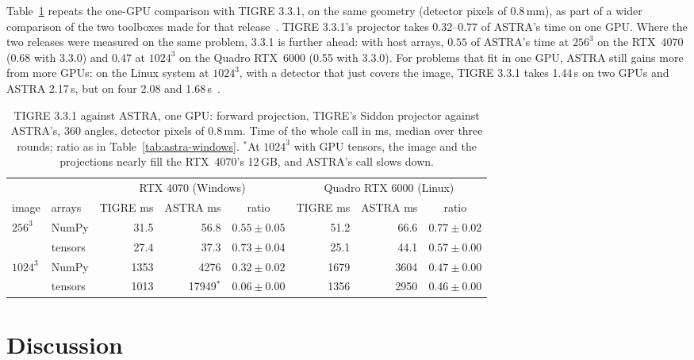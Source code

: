 \documentclass[11pt,a4paper]{article}
\theoremstyle{remark}
\begin{document}
Table~\ref{tab:astra-331} repeats the one-GPU comparison with TIGRE 3.3.1, on the same geometry (detector pixels of
0.8\,mm), as part of a wider comparison of the two toolboxes made for that release~\cite{tigre331astra}. TIGRE
3.3.1's projector takes 0.32--0.77 of ASTRA's time on one GPU. Where the two releases were measured on the same
problem, 3.3.1 is further ahead: with host arrays, $0.55$ of ASTRA's time at $256^3$ on the RTX~4070 (0.68 with
3.3.0) and 0.47 at $1024^3$ on the Quadro RTX~6000 (0.55 with 3.3.0). For problems that fit in one GPU, ASTRA still gains more from more GPUs: on
the Linux system at $1024^3$, with a detector that just covers the image, TIGRE 3.3.1 takes 1.44\,s on two GPUs and
ASTRA 2.17\,s, but on four 2.08 and 1.68\,s~\cite{tigre331astra}.

\begin{table}[h]
\centering
\caption{\label{tab:astra-331}TIGRE 3.3.1 against ASTRA, one GPU: forward projection, TIGRE's Siddon projector
against ASTRA's, 360 angles, detector pixels of 0.8\,mm. Time of the whole call in ms, median over three rounds;
ratio as in Table~\ref{tab:astra-windows}. $^*$At $1024^3$ with GPU tensors, the image and the projections nearly
fill the RTX~4070's 12\,GB, and ASTRA's call slows down.}
\small\setlength{\tabcolsep}{4pt}
\begin{tabular}{llrrcrrc}
\toprule
& & \multicolumn{3}{c}{RTX 4070 (Windows)} & \multicolumn{3}{c}{Quadro RTX 6000 (Linux)}\\
\cmidrule(lr){3-5}\cmidrule(lr){6-8}
image & arrays & TIGRE ms & ASTRA ms & ratio & TIGRE ms & ASTRA ms & ratio\\
\midrule
$256^3$ & NumPy & 31.5 & 56.8 & $0.55\pm0.05$ & 51.2 & 66.6 & $0.77\pm0.02$\\
 & tensors & 27.4 & 37.3 & $0.73\pm0.04$ & 25.1 & 44.1 & $0.57\pm0.00$\\
$1024^3$ & NumPy & 1353 & 4276 & $0.32\pm0.02$ & 1679 & 3604 & $0.47\pm0.00$\\
 & tensors & 1013 & 17949$^*$ & $0.06\pm0.00$ & 1356 & 2950 & $0.46\pm0.00$\\
\bottomrule
\end{tabular}
\end{table}

\section{Discussion}
\label{sec:discussion}
\end{document}
